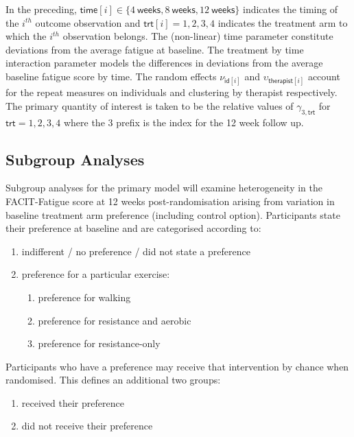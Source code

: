 \documentclass[
]{article}
\begin{document}
In the preceding, $\mathsf{time}[i] \in \{4 \mathsf{\ weeks}, 8 \mathsf{\ weeks}, 12 \mathsf{\ weeks}\}$ indicates the timing of the $i^{th}$ outcome observation and $\mathsf{trt}[i] = 1, 2, 3, 4$ indicates the treatment arm to which the $i^{th}$ observation belongs.
The (non-linear) time parameter constitute deviations from the average fatigue at baseline.
The treatment by time interaction parameter models the differences in deviations from the average baseline fatigue score by time.
The random effects $\nu_{\mathsf{id}[i]}$ and $\upsilon_{\mathsf{therapist}[i]}$ account for the repeat measures on individuals and clustering by therapist respectively.
The primary quantity of interest is taken to be the relative values of $\gamma_{3,\mathsf{trt}}$ for $\mathsf{trt} = 1, 2, 3, 4$ where the 3 prefix is the index for the 12 week follow up.

\hypertarget{subgroup-analyses}{%
  \subsection{Subgroup Analyses}\label{subgroup-analyses}}

Subgroup analyses for the primary model will examine heterogeneity in the FACIT-Fatigue score at 12 weeks post-randomisation arising from variation in baseline treatment arm preference (including control option).
Participants state their preference at baseline and are categorised according to:

\begin{enumerate}
  \item indifferent / no preference / did not state a preference
  \item preference for a particular exercise:
        \begin{enumerate}
          \item preference for walking
          \item preference for resistance and aerobic
          \item preference for resistance-only
        \end{enumerate}
\end{enumerate}

Participants who have a preference may receive that intervention by chance when randomised.
This defines an additional two groups:
\begin{enumerate}
  \item received their preference
  \item did not receive their preference
\end{enumerate}
\end{document}

